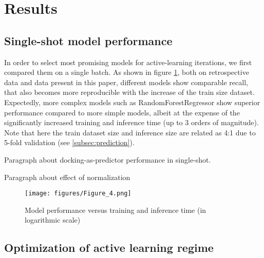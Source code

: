 \section{Results}

\subsection{Single-shot model performance}

In order to select most promising models for active-learning iterations, we first compared them on a single batch. As shown in figure \ref{fig:fig_4}, both on retrospective data \cite{ultralarge_docking_first} and data present in this paper, different models show comparable recall, that also becomes more reproducible with the increase of the train size dataset. Expectedly, more complex models such as RandomForestRegressor show superior performance compared to more simple models, albeit at the expense of the significantly increased training and inference time (up to 3 orders of magnitude). Note that here the train dataset size and inference size are related as 4:1 due to 5-fold validation (see \ref{subsec:prediction}). 

Paragraph about docking-as-predictor performance in single-shot.

Paragraph about effect of normalization

\begin{figure}[h]
\centering
\texttt{[image: figures/Figure\_4.png]}
\caption{Model performance versus training and inference time (in logarithmic scale)}
\label{fig:fig_4}
\end{figure}

\subsection{Optimization of active learning regime}

